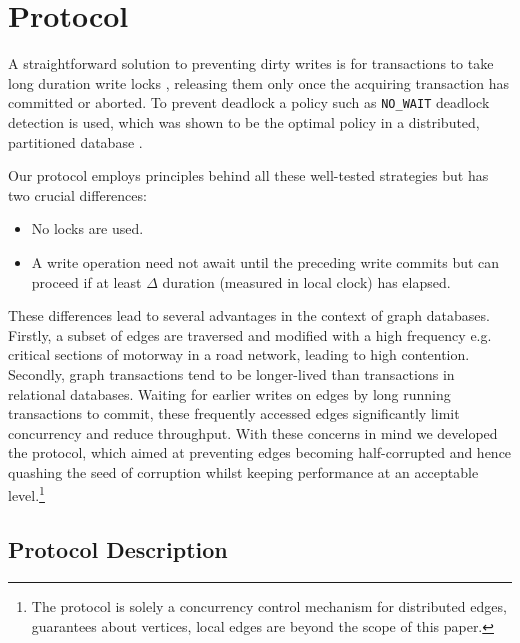 \section{\tDelta Protocol}
\label{sec:tdelta-protocol}

A straightforward solution to preventing dirty writes is for transactions to take long duration write locks \cite{Berenson1995}, releasing them only once the acquiring transaction has committed or aborted. To prevent deadlock a policy such as \texttt{NO_WAIT} deadlock detection is used, which was shown to be the optimal policy in a distributed, partitioned database \cite{Harding2017}.

Our \tDelta protocol employs principles behind all these well-tested strategies but has two crucial differences:
\begin{itemize}
\item No locks are used.
\item A write operation need not await until the preceding write commits but can proceed if at least $\Delta$ duration (measured in local clock) has elapsed.
\end{itemize}

These differences lead to several advantages in the context of graph databases. Firstly, a subset of edges are traversed and modified with a high frequency e.g. critical sections of motorway in a road network, leading to high contention. Secondly, graph transactions tend to be longer-lived than transactions in relational databases. Waiting for earlier writes on edges by long running transactions to commit, these frequently accessed edges significantly limit concurrency and reduce throughput. With these concerns in mind we developed the \tDelta protocol, which aimed at preventing edges becoming half-corrupted and hence quashing the seed of corruption whilst keeping performance at an acceptable level.\footnote{The \tDelta protocol is solely a concurrency control mechanism for distributed edges, guarantees about vertices, local edges are beyond the scope of this paper.}

\subsection{Protocol Description}
\label{sec:protocol-description}

